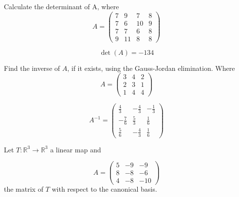 \begin{questions}

\question Calculate the determinant of A, where
$$
A=\left(\begin{array}{rrrr}
7 & 9 & 7 & 8 \\
7 & 6 & 10 & 9 \\
7 & 7 & 6 & 8 \\
9 & 11 & 8 & 8
\end{array}\right)
$$

\begin{solution}
$$\det(A)=-134$$
\end{solution}

\question Find the inverse of $A$, if it exists, using the Gauss-Jordan elimination. Where
$$
A=\left(\begin{array}{rrr}
3 & 4 & 2 \\
2 & 3 & 1 \\
1 & 4 & 4
\end{array}\right)
$$

\begin{solution}
$$A^{-1}=\left(\begin{array}{rrr}
\frac{4}{3} & -\frac{4}{3} & -\frac{1}{3} \\
-\frac{7}{6} & \frac{5}{3} & \frac{1}{6} \\
\frac{5}{6} & -\frac{4}{3} & \frac{1}{6}
\end{array}\right)$$
\end{solution}

\question Let $T:\mathbb{R}^3\rightarrow\mathbb{R}^3$  a linear map and
 
$$
A=\left(\begin{array}{rrr}
5 & -9 & -9 \\
8 & -8 & -6 \\
4 & -8 & -10
\end{array}\right)
$$
the matrix of $T$ with respect to the canonical basis.
\end{questions}
